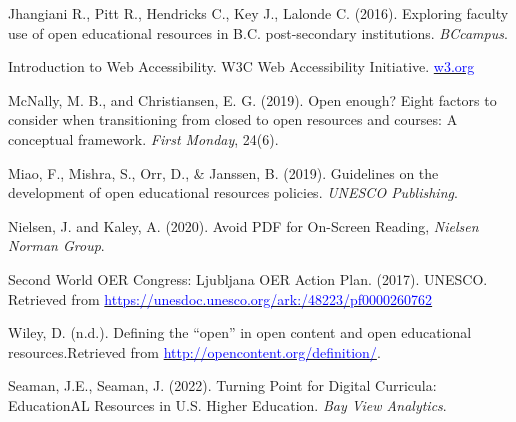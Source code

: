 \documentclass[11pt]{article}
\newcommand{\alink}[2]{\href{#1}{\textcolor{blue}{#2}}}
\begin{document}
\begin{thebibliography}{99}
   Jhangiani R., Pitt R., Hendricks C., Key J., Lalonde C. (2016). Exploring faculty use of open educational resources in B.C. post-secondary institutions. {\em BCcampus}. %

   Introduction to Web Accessibility.  W3C Web Accessibility Initiative. \alink{w3.org}{w3.org}%

   McNally, M. B., and Christiansen, E. G. (2019). Open enough? Eight factors to consider when transitioning from closed to open resources and courses: A conceptual framework. {\em First Monday}, 24(6).%

   Miao, F., Mishra, S., Orr, D., \& Janssen, B. (2019). Guidelines on the development of open educational resources policies. {\em UNESCO Publishing}.%

   Nielsen, J. and Kaley, A. (2020).  Avoid PDF for On-Screen Reading, {\em Nielsen Norman Group}.%

   Second World OER Congress: Ljubljana OER Action Plan. (2017). UNESCO. \newline Retrieved from \alink{https://unesdoc.unesco.org/ark:/48223/pf0000260762}{https://unesdoc.unesco.org/ark:/48223/pf0000260762}

   Wiley, D. (n.d.). Defining the ``open'' in open content and open educational resources.\newline Retrieved from \alink{http://opencontent.org/definition/}{http://opencontent.org/definition/}.

   Seaman, J.E., Seaman, J. (2022). Turning Point for Digital Curricula: EducationAL Resources in U.S. Higher Education. {\em Bay View Analytics}.%


\end{thebibliography}
\end{document}
